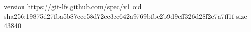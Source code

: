 version https://git-lfs.github.com/spec/v1
oid sha256:19875d27fba5b87cce58d72cc3cc642a9769bfbc2b9d9cff326d28f2e7a7ff1f
size 43840
